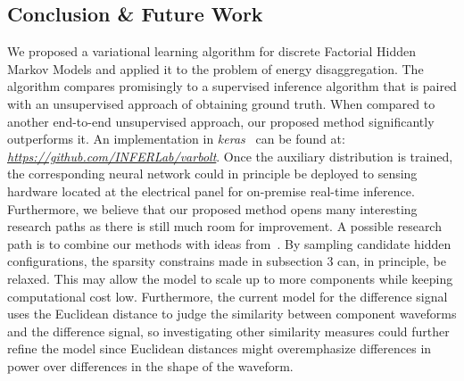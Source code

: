 \subsection{Conclusion \& Future Work}
We proposed a variational learning algorithm for discrete Factorial Hidden Markov Models and applied it to the problem of energy disaggregation. The algorithm compares promisingly to a supervised inference algorithm that is paired with an unsupervised approach of obtaining ground truth. When compared to another end-to-end unsupervised approach, our proposed method significantly outperforms it. An implementation in \emph{keras}~\cite{chollet2015} can be found at: \emph{\url{https://github.com/INFERLab/varbolt}}. Once the auxiliary distribution is trained, the corresponding neural network could in principle be deployed to sensing hardware located at the electrical panel for on-premise real-time inference.\\
Furthermore, we believe that our proposed method opens many interesting research paths as there is still much room for improvement. A possible research path is to combine our methods with ideas from~\cite{tang2013learning}. By sampling candidate hidden configurations, the sparsity constrains made in subsection 3 can, in principle, be relaxed. This may allow the model to scale up to more components while keeping computational cost low. Furthermore, the current model for the difference signal uses the Euclidean distance to judge the similarity between component waveforms and the difference signal, so investigating other similarity measures could further refine the model since Euclidean distances might overemphasize differences in power over differences in the shape of the waveform.

